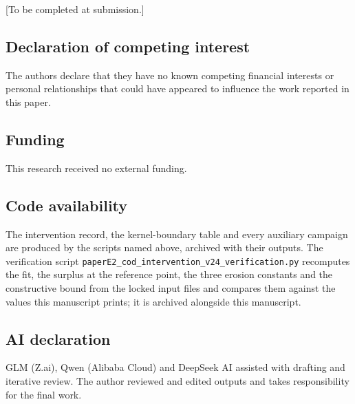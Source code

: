 \documentclass[11pt]{article}
\begin{document}
{[}To be completed at submission.{]}

\subsection*{Declaration of competing interest}

The authors declare that they have no known competing financial
interests or personal relationships that could have appeared to
influence the work reported in this paper.

\subsection*{Funding}

This research received no external funding.

\subsection*{Code availability}

The intervention record, the kernel-boundary table and every auxiliary
campaign are produced by the scripts named above, archived with their
outputs. The verification script
\texttt{paperE2\_cod\_intervention\_v24\_verification.py} recomputes
the fit, the surplus at the reference point, the three erosion
constants and the constructive bound from the locked input files and
compares them against the values this manuscript prints; it is archived
alongside this manuscript.

\subsection*{AI declaration}
GLM (Z.ai), Qwen (Alibaba Cloud) and DeepSeek AI assisted with drafting
and iterative review. The author reviewed and edited outputs and takes
responsibility for the final work.
\end{document}
